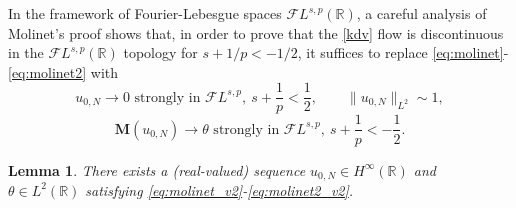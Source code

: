 \documentclass[%
11pt,  reqno]{amsart}
\newcommand{\5}{\textup{V}}
\newtheorem{lemma}[theorem]{Lemma}
\theoremstyle{remark}
\newcommand{\R}{\mathbb{R}}
\newcommand{\MMb}{\mathbf{M}}
\numberwithin{equation}{section}
\numberwithin{theorem}{section}
\begin{document}
In the framework of Fourier-Lebesgue spaces $\mathcal{F}L^{s,p}(\R)$, a careful analysis of Molinet's proof shows that, in order to prove that the \eqref{kdv} flow is discontinuous in the $\mathcal{F}L^{s,p}(\R)$ topology for $s+1/p<-1/2$, it suffices to replace \eqref{eq:molinet}-\eqref{eq:molinet2} with
\begin{equation}\label{eq:molinet_v2}
	u_{0,N}\to 0 \mbox{ strongly in }\mathcal{F}L^{s,p},\ s+\frac1p<\frac12,\qquad \|u_{0,N}\|_{L^2}\sim 1,
\end{equation}
\begin{equation}\label{eq:molinet2_v2}
 \MMb(u_{0,N}) \to \theta \mbox{ strongly in }\mathcal{F}L^{s,p}, \ s+\frac1p<-\frac12.
\end{equation}
\begin{lemma}
	There exists a (real-valued) sequence $u_{0,N}\in H^\infty(\R)$ and $\theta\in L^2(\R)$ satisfying \eqref{eq:molinet_v2}-\eqref{eq:molinet2_v2}.
\end{lemma}
\end{document}
